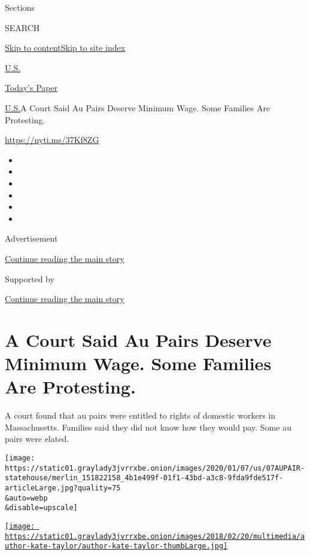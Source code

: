 Sections

SEARCH

\protect\hyperlink{site-content}{Skip to
content}\protect\hyperlink{site-index}{Skip to site index}

\href{https://www.nytimes3xbfgragh.onion/section/us}{U.S.}

\href{https://myaccount.nytimes3xbfgragh.onion/auth/login?response_type=cookie\&client_id=vi}{}

\href{https://www.nytimes3xbfgragh.onion/section/todayspaper}{Today's
Paper}

\href{/section/us}{U.S.}\textbar{}A Court Said Au Pairs Deserve Minimum
Wage. Some Families Are Protesting.

\url{https://nyti.ms/37Kf8ZG}

\begin{itemize}
\item
\item
\item
\item
\item
\item
\end{itemize}

Advertisement

\protect\hyperlink{after-top}{Continue reading the main story}

Supported by

\protect\hyperlink{after-sponsor}{Continue reading the main story}

\hypertarget{a-court-said-au-pairs-deserve-minimum-wage-some-families-are-protesting}{%
\section{A Court Said Au Pairs Deserve Minimum Wage. Some Families Are
Protesting.}\label{a-court-said-au-pairs-deserve-minimum-wage-some-families-are-protesting}}

A court found that au pairs were entitled to rights of domestic workers
in Massachusetts. Families said they did not know how they would pay.
Some au pairs were elated.

\texttt{[image: https://static01.graylady3jvrrxbe.onion/images/2020/01/07/us/07AUPAIR-statehouse/merlin\_151822158\_4b1e499f-01f1-43bd-a3c8-9fda9fde517f-articleLarge.jpg?quality=75\\\&auto=webp\\\&disable=upscale]}

\href{https://www.nytimes3xbfgragh.onion/by/kate-taylor}{\texttt{[image: https://static01.graylady3jvrrxbe.onion/images/2018/02/20/multimedia/author-kate-taylor/author-kate-taylor-thumbLarge.jpg]}}

